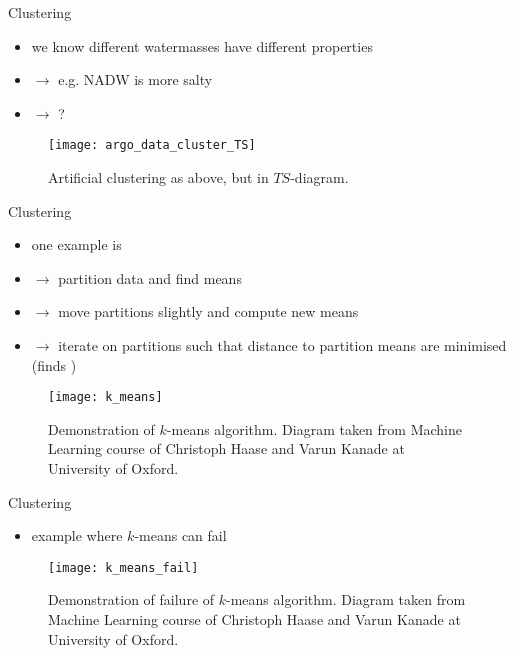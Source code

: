\documentclass[xcolor=x11names,compress]{beamer}
\renewcommand{\(}{\begin{columns}}
\renewcommand{\)}{\end{columns}}
\newcommand{\<}[1]{\begin{column}{#1}}
\renewcommand{\>}{\end{column}}
\begin{document}

\begin{frame}{Clustering}

\begin{itemize}
  \item we know different watermasses have different properties
  \item[] $\to$ e.g. NADW is more salty
  \item[] $\to$ ?
\end{itemize}

\begin{figure}
  \texttt{[image: argo\_data\_cluster\_TS]}
  \caption{Artificial clustering as above, but in $TS$-diagram.}
\end{figure}

\end{frame}


\begin{frame}{Clustering}

\parbox{0.5\textwidth}{
\begin{itemize}
  \item one example is 
  \item[] $\to$ partition data and find means
  \item[] $\to$ move partitions slightly and compute new means
  \item[] $\to$ iterate on partitions such that distance to partition means are
  minimised {\tiny (finds )}
\end{itemize}
}\parbox{0.5\textwidth}{
\begin{figure}
  \texttt{[image: k\_means]}
  \caption{Demonstration of $k$-means algorithm. Diagram taken from Machine
  Learning course of Christoph Haase and Varun Kanade at University of Oxford.}
\end{figure}
}

\end{frame}


\begin{frame}{Clustering}

\begin{itemize}
  \item example where $k$-means can fail
\end{itemize}

\begin{figure}
  \texttt{[image: k\_means\_fail]}
  \caption{Demonstration of failure of $k$-means algorithm. Diagram taken from
  Machine Learning course of Christoph Haase and Varun Kanade at University of
  Oxford.}
\end{figure}

\end{frame}
\end{document}
